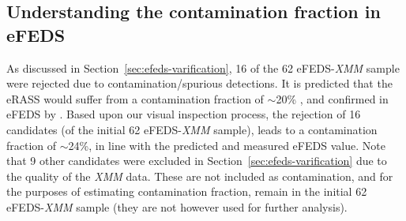 \documentclass[fleqn,usenatbib]{mnras}
\begin{document}



\subsection{Understanding the contamination fraction in eFEDS}
\label{sec:contamfrac}

As discussed in Section~\ref{sec:efeds-varification}, 16 of the 62 eFEDS-{\em XMM} sample were rejected due to contamination/spurious detections.  It is predicted that the eRASS would suffer from a contamination fraction of $\sim$20\% \citep{simerass}, and confirmed in eFEDS by \cite{efedsclusteropticalcat}.  Based upon our visual inspection process, the rejection of 16 candidates (of the initial 62 eFEDS-{\em XMM} sample), leads to a contamination fraction of $\sim$24\%, in line with the predicted and measured eFEDS value.  Note that 9 other candidates were excluded in Section~\ref{sec:efeds-varification} due to the quality of the {\em XMM} data.  These are not included as contamination, and for the purposes of estimating contamination fraction, remain in the initial 62 eFEDS-{\em XMM} sample (they are not however used for further analysis).
\end{document}
